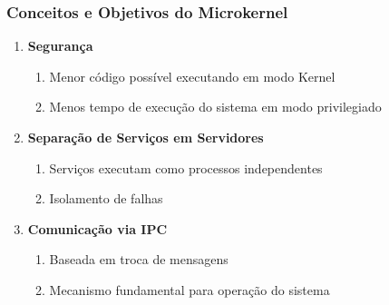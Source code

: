 \documentclass{beamer}
\begin{document}
\begin{frame}[fragile]
\frametitle{Conceitos e Objetivos do Microkernel}

\begin{enumerate}
    \vfill \item \textbf{Segurança}
    \begin{enumerate}
        \item Menor código possível executando em modo Kernel
        \item Menos tempo de execução do sistema em modo privilegiado
    \end{enumerate}
    
    \vfill \item \textbf{Separação de Serviços em Servidores}
    \begin{enumerate}
        \item Serviços executam como processos independentes
        \item Isolamento de falhas
    \end{enumerate}
    
    \vfill \item \textbf{Comunicação via IPC}
    \begin{enumerate}
        \item Baseada em troca de mensagens
        \item Mecanismo fundamental para operação do sistema
    \end{enumerate}
\end{enumerate}
\end{frame}
\end{document}
